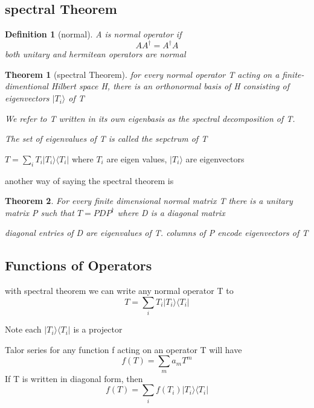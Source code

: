 \documentclass[10pt]{article}
\theoremstyle{break}
\newtheorem{thm}{Theorem}[subsection]
\newtheorem{defn}{Definition}[subsection]
\begin{document}
\subsection{spectral Theorem}

\begin{defn}[normal]
    A is normal operator if 
    $$AA^\dagger=A^\dagger A$$
    both unitary and hermitean operators are normal
\end{defn}

\begin{thm}[spectral Theorem]
    for every normal operator T acting on a finite-dimentional Hilbert space H,
    there is an orthonormal basis of H consisting of eigenvectors $|T_i\rangle$ of T

    We refer to T written in its own eigenbasis as the spectral decomposition of T.

    The set of eigenvalues of T is called the sepctrum of T
\end{thm}

$T=\sum_iT_i|T_i\rangle\langle T_i|$ where $T_i$ are eigen values, $|T_i\rangle$ are eigenvectors

another way of saying the spectral theorem is 
\begin{thm}
    For every finite dimensional normal matrix T there is a unitary matrix 
    P such that $T=PDP^\dagger$ where D is a diagonal matrix

    diagonal entries of D are eigenvalues of T. columns of P encode eigenvectors of T
\end{thm}

\subsection{Functions of Operators}

with spectral theorem we can write any normal operator T to 
$$T=\sum_iT_i|T_i\rangle\langle T_i|$$

Note each $|T_i\rangle\langle T_i|$ is a projector


Talor series for any function f acting on an operator T will have 
$$f(T)=\sum_ma_mT^m$$
If T is written in diagonal form,
then$$f(T)=\sum_if(T_i)|T_i\rangle\langle T_i|$$
\end{document}
